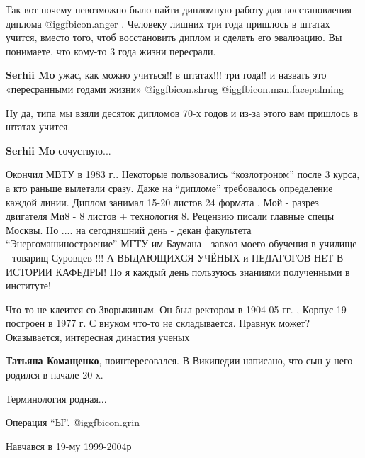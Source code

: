 \begin{itemize}

Так вот почему невозможно было найти дипломную работу для восстановления
диплома  @igg{fbicon.anger} . Человеку лишних три года пришлось в штатах учится, вместо того,
чтоб восстановить диплом и сделать его эвалюацию. Вы понимаете, что кому-то 3
года жизни пересрали.

\begin{itemize} %
\textbf{Serhii Mo} ужас, как можно учиться!! в штатах!!! три года!! и назвать
это «пересранными годами жизни»  @igg{fbicon.shrug}  @igg{fbicon.man.facepalming} 


Ну да, типа мы взяли десяток дипломов 70-х годов и из-за этого вам пришлось в штатах учится.

\textbf{Serhii Mo} сочуствую...

\end{itemize} %


Окончил МВТУ в 1983 г.. Некоторые пользовались \enquote{козлотроном} после 3 курса, а
кто раньше вылетали сразу. Даже на \enquote{дипломе} требовалось определение каждой
линии. Диплом занимал 15-20 листов 24 формата . Мой - разрез двигателя Ми8 - 8
листов + технология 8. Рецензию писали главные спецы Москвы. Но .... на
сегодняшний день - декан факультета \enquote{Энергомашиностроение} МГТУ им Баумана -
завхоз моего обучения в училище - товарищ Суровцев !!! А ВЫДАЮЩИХСЯ УЧЁНЫХ и
ПЕДАГОГОВ НЕТ В ИСТОРИИ КАФЕДРЫ! Но я каждый день пользуюсь знаниями
полученными в институте!


Что-то не клеится со Зворыкиным. Он был ректором в 1904-05 гг. , Корпус 19
построен в 1977 г. С внуком что-то не складывается. Правнук может? Оказывается,
интересная династия ученых

\begin{itemize} %
\textbf{Татьяна Комащенко}, поинтересовался. В Википедии написано, что сын у него родился в начале 20-х.
\end{itemize} %

Терминология родная...

Операция \enquote{Ы}. @igg{fbicon.grin} 

Навчався в 19-му 1999-2004р



\end{itemize} %
